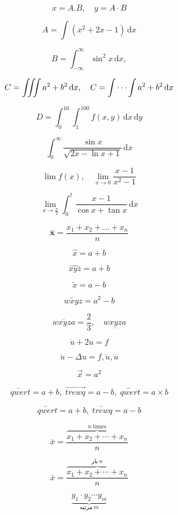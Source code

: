 \documentclass[12pt]{article}
\begin{document}
\[
x = A.B,\quad y = A \cdot B
\]

\[
A = \int (x^2+2x-1)\,\mathrm{d}x
\]

\[
B = \int_{-\infty}^{\infty} \sin^2x\,\mathrm{d}x,
\]

\[
C = \iiint a^2+b^2 \, \mathrm{d}x,\quad C = \idotsint a^2+b^2 \, \mathrm{d}x
\]

\[
D = \int_{0}^{10} \int_{1}^{100} f(x,y)\,\mathrm{d}x\,\mathrm{d}y
\]

\[
\int_{0}^{\infty}\frac{\sin{x}}{\sqrt{2x-\ln x+1}}\,\mathrm{d}x
\]

\[
\lim f(x),\quad \lim_{x \to 0 } \frac{x-1}{x^{2}-1}
\]

\[
\lim_{x \to \frac{\pi}{2}} \int_0^t \frac{x-1}{\cos x+ \tan x}\, \mathrm{d}x
\]

\[
\mathbf{\bar{x}} = \frac{x_1+x_2+\dots+x_n}{n}
\]

\[
\hat{x} = a+b
\]

\[
\widehat{xyz} = a+b
\]

\[
\tilde{x} = a-b
\]

\[
\widetilde{wxyz} = a^2-b
\]

\[
\overline{wxyza} = \frac{2}{3},\quad \underline{wxyza}
\]

\[
\dot{u} + 2u = f
\]

\[
\ddot{u} - \Delta u = f, \dddot{u}, \ddddot{u}
\]

\[
\vec{x} = a^2
\]

\[
\overleftarrow{qwert} = a+b ,\; \overrightarrow{trewq} = a-b,\; \overleftrightarrow{qwert} = a \times b
\]

\[
 \underleftarrow{qwert} = a+b ,\; \underrightarrow{trewq} = a-b
\]

\[
\bar{x} = \frac{\overbrace{x_1 + x_2 + \cdots + x_n}^{n \ \mathrm{times}}}{n}
\]

\[
\bar{x} = \frac{\overbrace{x_1 + x_2 + \cdots + x_n}^{\text{بار} \ n}}{n}
\]

\[
\underbrace{y_1 \cdot y_2 \cdots y_m}_{\text{مرتبه} \ m}
\]
\end{document}
